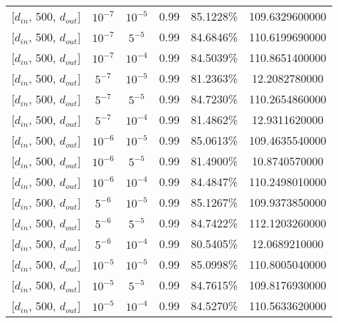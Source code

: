 \documentclass[]{report}
\begin{document}
\begin{center}
\begin{tabular}{l|c|c|c|c|c}
		 {[$d_{in}$, 500, $d_{out}$]}   & $10^{-7}$  & $10^{-5}$      & 0.99 & 85.1228\%   &  109.6329600000 \\
		 {[$d_{in}$, 500, $d_{out}$]}   & $10^{-7}$  & $5^{-5}$       & 0.99 & 84.6846\%   &  110.6199690000 \\
		 {[$d_{in}$, 500, $d_{out}$]}   & $10^{-7}$  & $10^{-4}$      & 0.99 & 84.5039\%   &  110.8651400000 \\
		 {[$d_{in}$, 500, $d_{out}$]}   & $5^{-7}$   & $10^{-5}$      & 0.99 & 81.2363\%   &   12.2082780000 \\
		 {[$d_{in}$, 500, $d_{out}$]}   & $5^{-7}$   & $5^{-5}$       & 0.99 & 84.7230\%   &  110.2654860000 \\
		 {[$d_{in}$, 500, $d_{out}$]}   & $5^{-7}$   & $10^{-4}$      & 0.99 & 81.4862\%   &   12.9311620000 \\
		 {[$d_{in}$, 500, $d_{out}$]}   & $10^{-6}$  & $10^{-5}$      & 0.99 & 85.0613\%   &  109.4635540000 \\
		 {[$d_{in}$, 500, $d_{out}$]}   & $10^{-6}$  & $5^{-5}$       & 0.99 & 81.4900\%   &   10.8740570000 \\
		 {[$d_{in}$, 500, $d_{out}$]}   & $10^{-6}$  & $10^{-4}$      & 0.99 & 84.4847\%   &  110.2498010000 \\
		 {[$d_{in}$, 500, $d_{out}$]}   & $5^{-6}$   & $10^{-5}$      & 0.99 & 85.1267\%   &  109.9373850000 \\
		 {[$d_{in}$, 500, $d_{out}$]}   & $5^{-6}$   & $5^{-5}$       & 0.99 & 84.7422\%   &  112.1203260000 \\
		 {[$d_{in}$, 500, $d_{out}$]}   & $5^{-6}$   & $10^{-4}$      & 0.99 & 80.5405\%   &   12.0689210000 \\
		 {[$d_{in}$, 500, $d_{out}$]}   & $10^{-5}$  & $10^{-5}$      & 0.99 & 85.0998\%   &  110.8005040000 \\
		 {[$d_{in}$, 500, $d_{out}$]}   & $10^{-5}$  & $5^{-5}$       & 0.99 & 84.7615\%   &  109.8176930000 \\
		 {[$d_{in}$, 500, $d_{out}$]}   & $10^{-5}$  & $10^{-4}$      & 0.99 & 84.5270\%   &  110.5633620000 \\
		\end{tabular}


\end{center}
\end{document}
